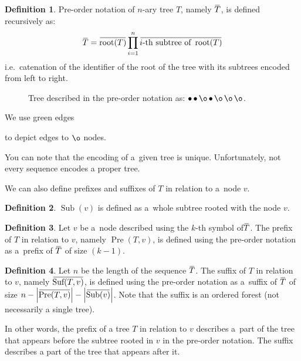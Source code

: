 \documentclass[final]{article}
\theoremstyle{definition}
\newtheorem{definition}{Definition}[subsection]
\theoremstyle{definition}
\theoremstyle{remark}
\newcommand{\ols}[1]{\mskip.5\thinmuskip\overline{\mskip-.5\thinmuskip {#1} \mskip-.5\thinmuskip}\mskip.5\thinmuskip} %
\newcommand{\enc}[1]{\ensuremath{\ols{#1}}}
\newcommand{\size}[1]{\ensuremath{\left|#1\right|}}
\DeclareMathOperator{\troot}{\text{root}}
\DeclareMathOperator{\tSub}{\text{Sub}}
\DeclareMathOperator{\tPre}{\text{Pre}}
\DeclareMathOperator{\tSuf}{\text{Suf}}
\DeclareMathOperator{\n}{\bullet}
\DeclareMathOperator{\no}{\o}
\begin{document}
\begin{definition}
    Pre-order notation of \(n\)-ary tree \(T\), namely \(\enc{T}\), is defined recursively as:
    \[\enc{T} = \enc{\troot(T)} \prod_{i=1}^{n} \enc{i\text{-th subtree of } \troot(T)}\]
    i.e.~catenation of the identifier of the root of the tree with its subtrees encoded from left to right.
\end{definition}

\begin{figure}[H]
    \centering
    
    \caption{Tree described in the pre-order notation as: \(\n \n \no \n \no \no \no\).}%
    \label{fig:oononnn}
\end{figure}

We use green edges 
\begin{minipage}{1.5em}

\end{minipage}
to depict edges to \(\no\) nodes.

You can note that the encoding of a~given tree is unique. Unfortunately, not every sequence encodes a proper tree.

We can also define prefixes and suffixes of \(T\) in relation to a~node \(v\).

\begin{definition}
    \(\tSub(v)\) is defined as a~whole subtree rooted with the node \(v\).
\end{definition}

\begin{definition}
    Let \(v\) be a~node described using the \(k\)-th symbol of\;\(\enc{T}\). The prefix of \(T\) in relation to \(v\), namely \(\tPre(T, v)\), is defined using the pre-order notation as a~prefix of \enc{T} of size \((k - 1)\).
\end{definition}

\begin{definition}
    Let \(n\) be the length of the sequence \(\enc{T}\). The suffix of \(T\) in relation to \(v\), namely \(\enc{\tSuf(T, v)}\), is defined using the pre-order notation as a~suffix of \enc{T} of size \(n - \size{\enc{\tPre(T, v)}} - \size{\enc{\tSub(v)}}\). Note that the suffix is an ordered forest (not necessarily a single tree).
\end{definition}

In other words, the prefix of a tree \(T\) in relation to \(v\) describes a~part of the tree that appears before the subtree rooted in \(v\) in the pre-order notation. The suffix describes a part of the tree that appears after it.
\end{document}
